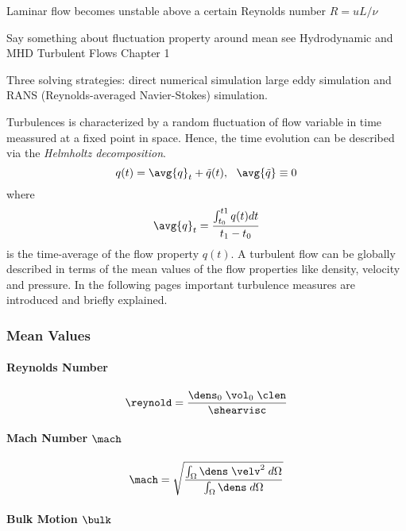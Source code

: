 Laminar flow becomes unstable above a certain Reynolds number $R = u L/\nu$

Say something about fluctuation property around mean
see Hydrodynamic and MHD Turbulent Flows Chapter 1

Three solving strategies: direct numerical simulation
large eddy simulation and RANS (Reynolds-averaged Navier-Stokes) simulation.

Turbulences is characterized by a random fluctuation of flow variable in time
meassured at a fixed point in space. Hence, the time evolution can be described
via the \emph{Helmholtz decomposition}.
\begin{equation}
    q(t) = \avg{q}_t + \tilde{q}(t), \ \ \avg{\tilde{q}} \equiv 0
\end{equation}
where 
\begin{equation}
    \avg{q}_t = \frac{\int_{t_0}^{t1} q(t) dt}{t_1 - t_0}
\end{equation}
is the time-average of the flow property $q(t)$. A turbulent flow can be
globally described in terms of the mean values of the flow properties like
density, velocity and pressure. In the following pages important turbulence
measures are introduced and briefly explained.

\subsubsection{Mean Values}

\paragraph{Reynolds Number}

\begin{equation}
\label{eq:reynold}
    \reynold = \frac{\dens_0\;\vol_0\;\clen}{\shearvisc}
\end{equation}

\paragraph{Mach Number $\mach$}

\begin{equation}
\label{eq:mach}
    \mach = \sqrt{\frac{\int_\Omega \dens \; \velv^2 \; d\Omega}{\int_\Omega \dens \; d\Omega}}
\end{equation}

\paragraph{Bulk Motion $\bulk$}

